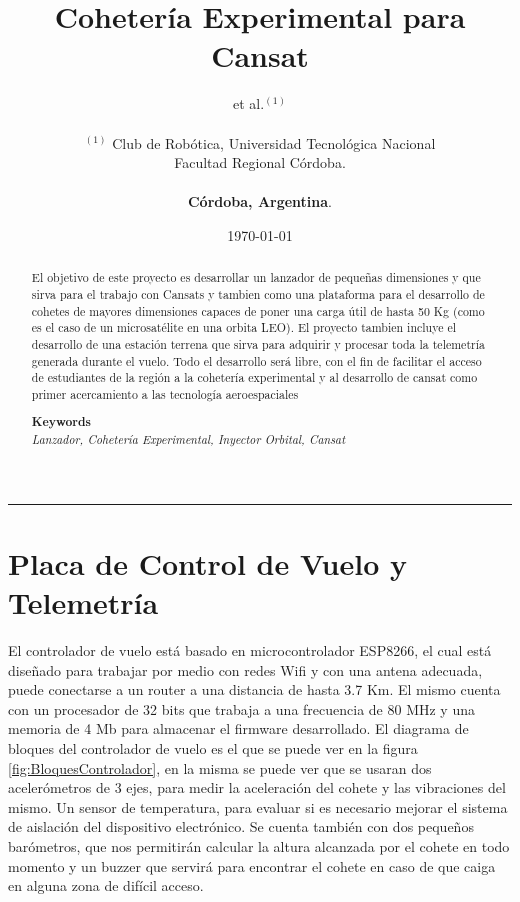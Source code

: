 \documentclass[a4paper]{article} %
\date{\today}
\def\keywords#1{\begin{center}{\bf Keywords}\\{#1}\end{center}} %
\begin{document}
\title{\textbf{Cohetería Experimental para Cansat}}

\author{et al.$^{(1)}$ \\\\
       $^{(1)}$ Club de Rob\'{o}tica, Universidad Tecnol\'{o}gica Nacional \\Facultad Regional C\'{o}rdoba. \\\\ \textbf{C\'{o}rdoba, Argentina}.\\ 
       }

\maketitle

\thispagestyle{empty}
\begin{center}\rule{0.9\textwidth}{0.1mm} \end{center} 


\begin{abstract}
El objetivo de este proyecto es desarrollar un lanzador de pequeñas dimensiones y que sirva para el trabajo con Cansats y tambien como una plataforma para el desarrollo de cohetes de mayores dimensiones capaces de poner una carga útil de hasta 50 Kg (como es el caso de un microsatélite en una orbita LEO). El proyecto tambien incluye el desarrollo de una estación terrena que sirva para adquirir y procesar toda la telemetría generada durante el vuelo. Todo el desarrollo será libre, con el fin de facilitar el acceso de estudiantes de la región a la cohetería experimental y al desarrollo de cansat como primer acercamiento a las tecnología aeroespaciales
\vspace*{.15cm}

\keywords{\textit{Lanzador, Cohetería Experimental, Inyector Orbital, Cansat}}

\vspace*{.1cm}
\end{abstract}

\section{Placa de Control de Vuelo y Telemetría}
El controlador de vuelo está basado en microcontrolador ESP8266, el cual está diseñado para trabajar por medio con redes Wifi y con una antena adecuada, puede conectarse a un router a una distancia de hasta 3.7 Km. El mismo cuenta con un procesador de 32 bits que trabaja a una frecuencia de 80 MHz y una memoria de 4 Mb para almacenar el firmware desarrollado.
El diagrama de bloques del controlador de vuelo es el que se puede ver en la figura \ref{fig:BloquesControlador}, en la misma se puede ver que se usaran dos acelerómetros de 3 ejes, para medir la aceleración del cohete y las vibraciones del mismo. Un sensor de temperatura, para evaluar si es necesario mejorar el sistema de aislación del dispositivo electrónico. Se cuenta también con dos pequeños barómetros, que nos permitirán calcular la altura alcanzada por el cohete en todo momento y un buzzer que servirá para encontrar el cohete en caso de que caiga en alguna zona de difícil acceso.
\end{document}
